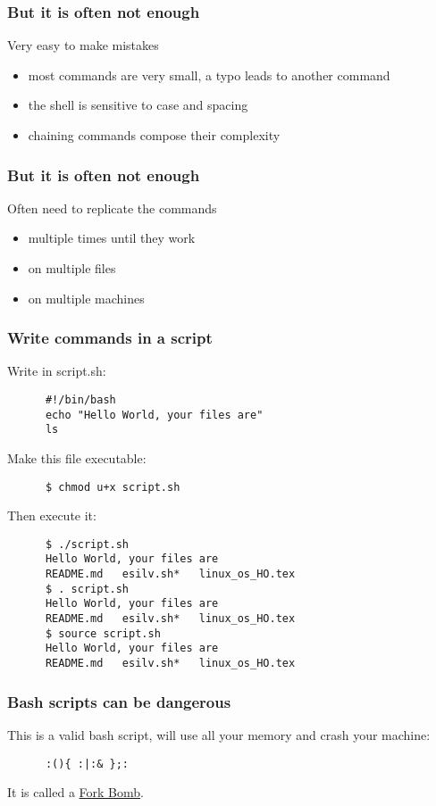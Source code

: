 \begin{frame}[fragile]
   \frametitle{But it is often not enough}
   Very easy to make mistakes
   \begin{itemize}
      \item most commands are very small, a typo leads to another command
      \item the shell is sensitive to case and spacing
      \item chaining commands compose their complexity
   \end{itemize}
\end{frame}

\begin{frame}[fragile]
   \frametitle{But it is often not enough}
   Often need to replicate the commands
   \begin{itemize}
      \item multiple times until they work
      \item on multiple files
      \item on multiple machines
   \end{itemize}
\end{frame}

\begin{frame}[fragile]\frametitle{Write commands in a script}
   \footnotesize
   Write in script.sh:
   \begin{verbatim}
      #!/bin/bash
      echo "Hello World, your files are"
      ls
   \end{verbatim}
   Make this file executable:
   \begin{verbatim}
      $ chmod u+x script.sh
   \end{verbatim}
   Then execute it:
   \begin{verbatim}
      $ ./script.sh
      Hello World, your files are
      README.md   esilv.sh*   linux_os_HO.tex
      $ . script.sh
      Hello World, your files are
      README.md   esilv.sh*   linux_os_HO.tex
      $ source script.sh
      Hello World, your files are
      README.md   esilv.sh*   linux_os_HO.tex
   \end{verbatim}
\end{frame}

\begin{frame}[fragile]
   \frametitle{Bash scripts can be dangerous}
   This is a valid bash script, will use all your memory and crash your machine:
   \begin{verbatim}
      :(){ :|:& };:
   \end{verbatim}
   It is called a \href{https://en.wikipedia.org/wiki/Fork_bomb}{Fork Bomb}.
\end{frame}


